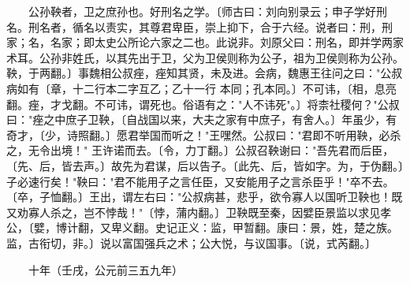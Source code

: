 　　公孙鞅者，卫之庶孙也。好刑名之学。〔师古曰：刘向别录云；申子学好刑名。刑名者，循名以责实，其尊君卑臣，崇上抑下，合于六经。说者曰：刑，刑家；名，名家；即太史公所论六家之二也。此说非。刘原父曰：刑名，即并学两家术耳。公孙非姓氏，以其先出于卫，父为卫侯则称为公子，祖为卫侯则称为公孙。鞅，于两翻。〕事魏相公叔痤，痤知其贤，未及进。会病，魏惠王往问之曰："公叔病如有〔章，十二行本二字互乙；乙十一行 本同；孔本同。〕不可讳，〔相，息亮翻。痤，才戈翻。不可讳，谓死也。俗语有之："人不讳死"。〕将柰社稷何？"公叔曰："痤之中庶子卫鞅，〔自战国以来，大夫之家有中庶子，有舍人。〕年虽少，有奇才，〔少，诗照翻。〕愿君举国而听之！"王嘿然。公叔曰："君即不听用鞅，必杀之，无令出境！" 王许诺而去。〔令，力丁翻。〕公叔召鞅谢曰："吾先君而后臣，〔先、后，皆去声。〕故先为君谋，后以告子。〔此先、后，皆如字。为，于伪翻。〕子必速行矣！"鞅曰："君不能用子之言任臣，又安能用子之言杀臣乎！"卒不去。〔卒，子恤翻。〕王出，谓左右曰："公叔病甚，悲乎，欲令寡人以国听卫鞅也！既又劝寡人杀之，岂不悖哉！"〔悖，蒲内翻。〕卫鞅既至秦，因嬖臣景监以求见孝公，〔嬖，博计翻，又卑义翻。史记正义：监，甲暂翻。康曰：景，姓，楚之族。监，古衔切，非。〕说以富国强兵之术；公大悦，与议国事。〔说，式芮翻。〕

　　十年（壬戌，公元前三五九年）

